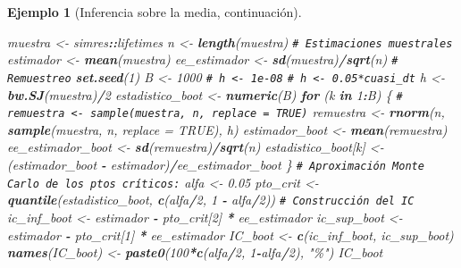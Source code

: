 \documentclass[
  spanish,
  10pt,
]{book}
\newenvironment{Shaded}{\begin{snugshade}}{\end{snugshade}}
\newcommand{\AttributeTok}[1]{\textcolor[rgb]{0.13,0.29,0.53}{#1}}
\newcommand{\CommentTok}[1]{\textcolor[rgb]{0.56,0.35,0.01}{\textit{#1}}}
\newcommand{\ConstantTok}[1]{\textcolor[rgb]{0.56,0.35,0.01}{#1}}
\newcommand{\ControlFlowTok}[1]{\textcolor[rgb]{0.13,0.29,0.53}{\textbf{#1}}}
\newcommand{\DecValTok}[1]{\textcolor[rgb]{0.00,0.00,0.81}{#1}}
\newcommand{\FloatTok}[1]{\textcolor[rgb]{0.00,0.00,0.81}{#1}}
\newcommand{\FunctionTok}[1]{\textcolor[rgb]{0.13,0.29,0.53}{\textbf{#1}}}
\newcommand{\NormalTok}[1]{#1}
\newcommand{\OtherTok}[1]{\textcolor[rgb]{0.56,0.35,0.01}{#1}}
\newcommand{\SpecialCharTok}[1]{\textcolor[rgb]{0.81,0.36,0.00}{\textbf{#1}}}
\newcommand{\StringTok}[1]{\textcolor[rgb]{0.31,0.60,0.02}{#1}}
\theoremstyle{break}
\newtheorem{example}{Ejemplo}[chapter]
\theoremstyle{nonumberplain}
\renewcommand{\CommentTok}[1]{\textcolor[rgb]{0.41,0.41,0.41}{\texttt{#1}}}
\begin{document}
\begin{example}[Inferencia sobre la media, continuación]
\begin{Shaded}
\begin{Highlighting}[]
\NormalTok{muestra }\OtherTok{\textless{}{-}}\NormalTok{ simres}\SpecialCharTok{::}\NormalTok{lifetimes}
\NormalTok{n }\OtherTok{\textless{}{-}} \FunctionTok{length}\NormalTok{(muestra)}
\CommentTok{\# Estimaciones muestrales}
\NormalTok{estimador }\OtherTok{\textless{}{-}} \FunctionTok{mean}\NormalTok{(muestra)}
\NormalTok{ee\_estimador }\OtherTok{\textless{}{-}} \FunctionTok{sd}\NormalTok{(muestra)}\SpecialCharTok{/}\FunctionTok{sqrt}\NormalTok{(n)}
\CommentTok{\# Remuestreo}
\FunctionTok{set.seed}\NormalTok{(}\DecValTok{1}\NormalTok{)}
\NormalTok{B }\OtherTok{\textless{}{-}} \DecValTok{1000}
\CommentTok{\# h \textless{}{-} 1e{-}08}
\CommentTok{\# h \textless{}{-} 0.05*cuasi\_dt}
\NormalTok{h }\OtherTok{\textless{}{-}} \FunctionTok{bw.SJ}\NormalTok{(muestra)}\SpecialCharTok{/}\DecValTok{2}
\NormalTok{estadistico\_boot }\OtherTok{\textless{}{-}} \FunctionTok{numeric}\NormalTok{(B)}
\ControlFlowTok{for}\NormalTok{ (k }\ControlFlowTok{in} \DecValTok{1}\SpecialCharTok{:}\NormalTok{B) \{}
  \CommentTok{\# remuestra \textless{}{-} sample(muestra, n, replace = TRUE)}
\NormalTok{  remuestra }\OtherTok{\textless{}{-}} \FunctionTok{rnorm}\NormalTok{(n, }\FunctionTok{sample}\NormalTok{(muestra, n, }\AttributeTok{replace =} \ConstantTok{TRUE}\NormalTok{), h)}
\NormalTok{  estimador\_boot }\OtherTok{\textless{}{-}} \FunctionTok{mean}\NormalTok{(remuestra)}
\NormalTok{  ee\_estimador\_boot }\OtherTok{\textless{}{-}} \FunctionTok{sd}\NormalTok{(remuestra)}\SpecialCharTok{/}\FunctionTok{sqrt}\NormalTok{(n)}
\NormalTok{  estadistico\_boot[k] }\OtherTok{\textless{}{-}}\NormalTok{ (estimador\_boot }\SpecialCharTok{{-}}\NormalTok{ estimador)}\SpecialCharTok{/}\NormalTok{ee\_estimador\_boot}
\NormalTok{\}}
\CommentTok{\# Aproximación Monte Carlo de los ptos críticos:}
\NormalTok{alfa }\OtherTok{\textless{}{-}} \FloatTok{0.05}
\NormalTok{pto\_crit }\OtherTok{\textless{}{-}} \FunctionTok{quantile}\NormalTok{(estadistico\_boot, }\FunctionTok{c}\NormalTok{(alfa}\SpecialCharTok{/}\DecValTok{2}\NormalTok{, }\DecValTok{1} \SpecialCharTok{{-}}\NormalTok{ alfa}\SpecialCharTok{/}\DecValTok{2}\NormalTok{))}
\CommentTok{\# Construcción del IC}
\NormalTok{ic\_inf\_boot }\OtherTok{\textless{}{-}}\NormalTok{ estimador  }\SpecialCharTok{{-}}\NormalTok{ pto\_crit[}\DecValTok{2}\NormalTok{] }\SpecialCharTok{*}\NormalTok{ ee\_estimador}
\NormalTok{ic\_sup\_boot }\OtherTok{\textless{}{-}}\NormalTok{ estimador  }\SpecialCharTok{{-}}\NormalTok{ pto\_crit[}\DecValTok{1}\NormalTok{] }\SpecialCharTok{*}\NormalTok{ ee\_estimador}
\NormalTok{IC\_boot }\OtherTok{\textless{}{-}} \FunctionTok{c}\NormalTok{(ic\_inf\_boot, ic\_sup\_boot)}
\FunctionTok{names}\NormalTok{(IC\_boot) }\OtherTok{\textless{}{-}} \FunctionTok{paste0}\NormalTok{(}\DecValTok{100}\SpecialCharTok{*}\FunctionTok{c}\NormalTok{(alfa}\SpecialCharTok{/}\DecValTok{2}\NormalTok{, }\DecValTok{1}\SpecialCharTok{{-}}\NormalTok{alfa}\SpecialCharTok{/}\DecValTok{2}\NormalTok{), }\StringTok{"\%"}\NormalTok{)}
\NormalTok{IC\_boot}
\end{Highlighting}
\end{Shaded}


\end{example}
\end{document}
